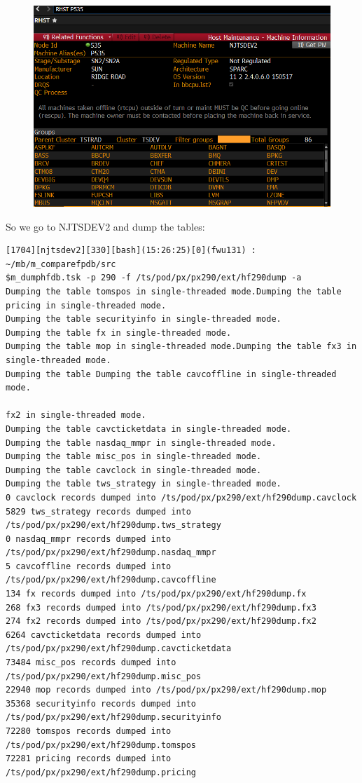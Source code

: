 \documentclass[8pt,]{article}
\begin{document}
\begin{figure}[htbp]
\centering
\includegraphics{rhst_p535.png}
\caption{}
\end{figure}

So we go to NJTSDEV2 and dump the tables:

\begin{verbatim}
[1704][njtsdev2][330][bash](15:26:25)[0](fwu131) : ~/mb/m_comparefpdb/src
$m_dumphfdb.tsk -p 290 -f /ts/pod/px/px290/ext/hf290dump -a
Dumping the table tomspos in single-threaded mode.Dumping the table
pricing in single-threaded mode.
Dumping the table securityinfo in single-threaded mode.
Dumping the table fx in single-threaded mode.
Dumping the table mop in single-threaded mode.Dumping the table fx3 in single-threaded mode.
Dumping the table Dumping the table cavcoffline in single-threaded mode.

fx2 in single-threaded mode.
Dumping the table cavcticketdata in single-threaded mode.
Dumping the table nasdaq_mmpr in single-threaded mode.
Dumping the table misc_pos in single-threaded mode.
Dumping the table cavclock in single-threaded mode.
Dumping the table tws_strategy in single-threaded mode.
0 cavclock records dumped into /ts/pod/px/px290/ext/hf290dump.cavclock
5829 tws_strategy records dumped into /ts/pod/px/px290/ext/hf290dump.tws_strategy
0 nasdaq_mmpr records dumped into /ts/pod/px/px290/ext/hf290dump.nasdaq_mmpr
5 cavcoffline records dumped into /ts/pod/px/px290/ext/hf290dump.cavcoffline
134 fx records dumped into /ts/pod/px/px290/ext/hf290dump.fx
268 fx3 records dumped into /ts/pod/px/px290/ext/hf290dump.fx3
274 fx2 records dumped into /ts/pod/px/px290/ext/hf290dump.fx2
6264 cavcticketdata records dumped into /ts/pod/px/px290/ext/hf290dump.cavcticketdata
73484 misc_pos records dumped into /ts/pod/px/px290/ext/hf290dump.misc_pos
22940 mop records dumped into /ts/pod/px/px290/ext/hf290dump.mop
35368 securityinfo records dumped into /ts/pod/px/px290/ext/hf290dump.securityinfo
72280 tomspos records dumped into /ts/pod/px/px290/ext/hf290dump.tomspos
72281 pricing records dumped into /ts/pod/px/px290/ext/hf290dump.pricing
\end{verbatim}
\end{document}
